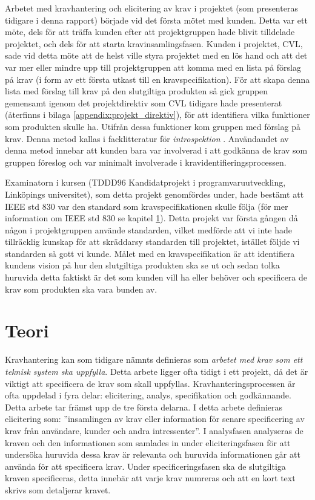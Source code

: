 Arbetet med kravhantering och elicitering av krav i projektet (som presenteras tidigare i denna rapport) började vid det första mötet med kunden. Detta var ett möte, dels för att träffa kunden efter att projektgruppen hade blivit tilldelade projektet, och dels för att starta kravinsamlingsfasen. Kunden i projektet, CVL, sade vid detta möte att de helst ville styra projektet med en lös hand och att det var mer eller mindre upp till projektgruppen att komma med en lista på förslag på krav (i form av ett första utkast till en kravspecifikation). För att skapa denna lista med förslag till krav på den slutgiltiga produkten så gick gruppen gemensamt igenom det projektdirektiv som CVL tidigare hade presenterat (återfinns i bilaga \ref{appendix:projekt_direktiv}), för att identifiera vilka funktioner som produkten skulle ha. Utifrån dessa funktioner kom gruppen med förslag på krav. Denna metod kallas i facklitteratur för \textit{introspektion} \cite{goguen1993techniques}. Användandet av denna metod innebar att kunden bara var involverad i att godkänna de krav som gruppen föreslog och var minimalt involverade i kravidentifieringsprocessen. 

Examinatorn i kursen (TDDD96 Kandidatprojekt i programvaruutveckling, Linköpings universitet), som detta projekt genomfördes under, hade bestämt att IEEE std 830 var den standard som kravspecifikationen skulle följa (för mer information om IEEE std 830 se kapitel \ref{sec:theory-jannering}). Detta projekt var första gången då någon i projektgruppen använde standarden, vilket medförde att vi inte hade tillräcklig kunskap för att skräddarsy standarden till projektet, istället följde vi standarden så gott vi kunde. Målet med en kravspecifikation är att identifiera kundens vision på hur den slutgiltiga produkten ska se ut och sedan tolka huruvida detta faktiskt är det som kunden vill ha eller behöver och specificera de krav som produkten ska vara bunden av. 


\section{Teori}
\label{sec:theory-jannering}
Kravhantering kan som tidigare nämnts definieras som \textit{arbetet med krav som ett teknisk system ska uppfylla}. Detta arbete ligger ofta tidigt i ett projekt, då det är viktigt att specificera de krav som skall uppfyllas. Kravhanteringsprocessen är ofta uppdelad i fyra delar: elicitering, analys, specifikation och godkännande. Detta arbete tar främst upp de tre första delarna. I detta arbete definieras elicitering som: ”insamlingen av krav eller information för senare specificering av krav från användare, kunder och andra intressenter”. I analysfasen analyseras de kraven och den informationen som samlades in under eliciteringsfasen för att undersöka huruvida dessa krav är relevanta och huruvida informationen går att använda för att specificera krav. Under specificeringsfasen ska de slutgiltiga kraven specificeras, detta innebär att varje krav numreras och att en kort text skrivs som detaljerar kravet.
